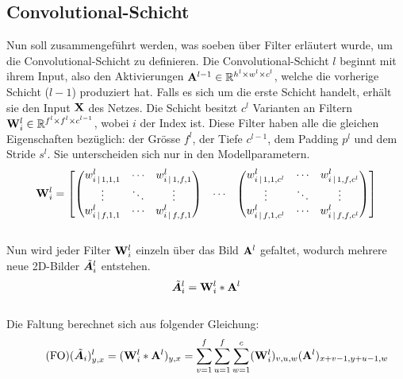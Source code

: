 \subsection{Convolutional-Schicht}
Nun soll zusammengeführt werden, was soeben über Filter erläutert
wurde, um die Convolutional-Schicht zu definieren.
\para{}
Die Convolutional-Schicht $l$ beginnt mit ihrem Input, also den
Aktivierungen $\mathbf{A}^{l-1} \in \mathbb{R}^{h^l \times w^l \times c^l}$, welche die vorherige Schicht ($l-1$) produziert hat.
Falls es sich um die erste Schicht handelt, erhält sie den Input $\mathbf{X}$ des Netzes.
\para{}
Die Schicht besitzt $c^l$ Varianten an Filtern $\mathbf{W}^l_i \in
\mathbb{R}^{f^l \times f^l \times c^{l-1}}$, wobei $i$ der Index ist. Diese Filter haben alle die gleichen
Eigenschaften bezüglich: der Grösse $f^l$, der Tiefe $c^{l-1}$, dem Padding
$p^l$ und dem Stride $s^l$. Sie unterscheiden sich nur in den Modellparametern.
\\
\begin{equation*}
  \mathbf{W}^l_i =
  \begin{bmatrix}
    \begin{pmatrix}
      w_{i\,|\,1,1,1}^l & \cdots & w_{i\,|\,1,f,1}^l \\
      \vdots & \ddots & \vdots \\
      w_{i\,|\,f,1,1}^l & \cdots & w_{i\,|\,f,f,1}^l
    \end{pmatrix}
    & \cdots &
    \begin{pmatrix}
      w_{i\,|\,1,1,c^l}^l & \cdots & w_{i\,|\,1,f,c^l}^l \\
      \vdots & \ddots & \vdots \\
      w_{i\,|\,f,1,c^l}^l & \cdots & w_{i\,|\,f,f,c^l}^l
    \end{pmatrix}
  \end{bmatrix}
\end{equation*}
\\
Nun wird jeder Filter $\mathbf{W}_i^l$ einzeln über das Bild
$\mathbf{A}^l$ gefaltet, wodurch mehrere neue 2D-Bilder $\tilde{\bm{A}}_i^l$ entstehen.
\\
\begin{equation}
  \tilde{\bm{A}}_i^l = \mathbf{W}_i^l * \mathbf{A}^l
\end{equation}
\\
Die Faltung berechnet sich aus folgender Gleichung:
\\
\begin{equation}\tag{FO}
  (\tilde{\bm{A}}_i)_{y,x}^l = (\mathbf{W}_i^l * \mathbf{A}^l)_{y,x} = \sum_{v=1}^{f} \sum_{u=1}^{f} \sum_{w=1}^c (\mathbf{W}^l_i)_{v,u,w} (\mathbf{A}^l)_{x+v-1,y+u-1,w}
\end{equation}
